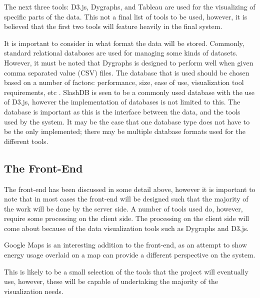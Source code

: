 \documentclass[12pt,onecolumn]{IEEEtran}
\begin{document}
The next three tools: D3.js, Dygraphs, and Tableau are used for the visualizing of specific parts of the data. This not a final list of tools to be used, however, it is believed that the first two tools will feature heavily in the final system. 

It is important to consider in what format the data will be stored. Commonly, standard relational databases are used for managing some kinds of datasets. However, it must be noted that Dygraphs is designed to perform well when given comma separated value (CSV) files. The database that is used should be chosen based on a number of factors: performance, size, ease of use, visualization tool requirements, etc \cite{database}. SlashDB is seen to be a commonly used database with the use of D3.js, however the implementation of databases is not limited to this.
The database is important as this is the interface between the data, and the tools used by the system. It may be the case that one database type does not have to be the only implemented; there may be multiple database formats used for the different tools.  

\subsection{The Front-End} \label{sec:TheFrontEnd}
The front-end has been discussed in some detail above, however it is important to note that in most cases the front-end will be designed such that the majority of the work will be done by the server side. A number of tools used do, however, require some processing on the client side. The processing on the client side will come about because of the data visualization tools such as Dygraphs and D3.js. 

Google Maps is an interesting addition to the front-end, as an attempt to show energy usage overlaid on a map can provide a different perspective on the system.

This is likely to be a small selection of the tools that the project will eventually use, however, these will be capable of undertaking the majority of the visualization needs.


\end{document}
